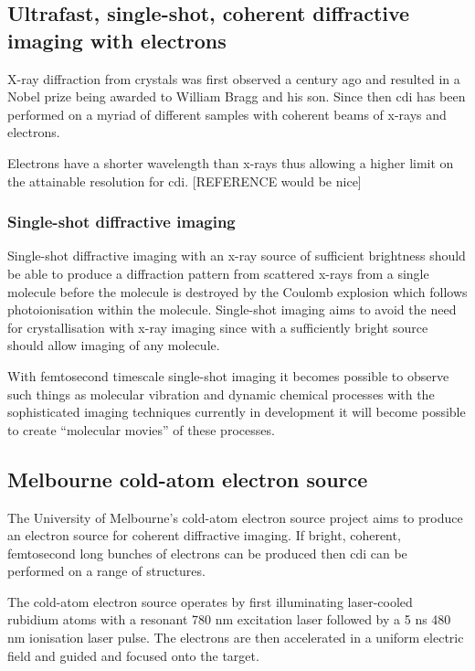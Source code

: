 \subsection{Ultrafast, single-shot, coherent diffractive imaging with electrons}
X-ray diffraction from crystals was first observed a century ago\cite{bragg_x-rays_1912} and resulted in a Nobel prize being awarded to William Bragg and his son. Since then \gls{cdi} has been performed on a myriad of different samples with coherent beams of x-rays and electrons.

Electrons have a shorter wavelength than x-rays thus allowing a higher limit on the attainable resolution for \gls{cdi}. [REFERENCE would be nice] 

\subsubsection{Single-shot diffractive imaging}
Single-shot diffractive imaging with an x-ray source of sufficient brightness should be able to produce a diffraction pattern from scattered x-rays from a single molecule before the molecule is destroyed by the Coulomb explosion which follows photoionisation within the molecule\cite{henderson_potential_1995, neutze_potential_2000}. Single-shot imaging aims to avoid the need for crystallisation with x-ray imaging since with a sufficiently bright source should allow imaging of any molecule.

With femtosecond timescale single-shot imaging it becomes possible to observe such things as molecular vibration and dynamic chemical processes\cite{zewail_4d_2006} with the sophisticated imaging techniques currently in development it will become possible to create ``molecular movies''\cite{dwyer_femtosecond_2006} of these processes.

\subsection{Melbourne cold-atom electron source}
The University of Melbourne's cold-atom electron source project aims to produce an electron source for coherent diffractive imaging. If bright, coherent, femtosecond long bunches of electrons can be produced then \gls{cdi} can be performed on a range of structures.

The cold-atom electron source operates by first illuminating laser-cooled rubidium atoms with a resonant 780 nm excitation laser followed by a 5 ns 480 nm ionisation laser pulse. The electrons are then accelerated in a uniform electric field and guided and focused onto the target.

